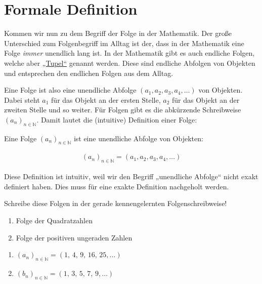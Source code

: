 \documentclass[fontsize=9pt,
               parskip=half-,
               DIV=14,
               listof=chapterentry,
               tocflat]{scrbook}
\begin{document}
\section{Formale Definition}

Kommen wir nun zu dem Begriff der Folge in der Mathematik. Der große Unterschied zum Folgenbegriff im Alltag ist der, dass in der Mathematik eine Folge \emph{immer} unendlich lang ist. In der Mathematik gibt es auch endliche Folgen, welche aber \href{https://de.wikibooks.org/wiki/Mathe\_für\_Nicht-Freaks:\_Tupel\_und\_geordnetes\_Paar}
{„Tupel“} genannt werden. Diese sind endliche Abfolgen von Objekten und entsprechen den endlichen Folgen aus dem Alltag.

Eine Folge ist also eine unendliche Abfolge $(a_{1},a_{2},a_{3},a_{4},\ldots )$ von Objekten. Dabei steht $a_{1}$ für das Objekt an der ersten Stelle, $a_{2}$ für das Objekt an der zweiten Stelle und so weiter. Für Folgen gibt es die abkürzende Schreibweise $(a_{n})_{n\in \mathbb {N} }$. Damit lautet die (intuitive) Definition einer Folge:

\begin{importantparagraph*}
Eine Folge $(a_{n})_{n\in \mathbb {N} }$ ist eine unendliche Abfolge von Objekten:

\begin{align*}
(a_{n})_{n\in \mathbb {N} }=(a_{1},a_{2},a_{3},a_{4},\ldots )
\end{align*}

\end{importantparagraph*}

Diese Definition ist intuitiv, weil wir den Begriff „unendliche Abfolge“ nicht exakt definiert haben. Dies muss für eine exakte Definition nachgeholt werden.

\begin{mdframed}[style=semanticbox,frametitleaboveskip=3pt,innerbottommargin=3pt,frametitle={Verständnisaufgabe}]
Schreibe diese Folgen in der gerade kennengelernten Folgenschreibweise!

\begin{enumerate}
\item Folge der Quadratzahlen
\item Folge der positiven ungeraden Zahlen
\end{enumerate}

\end{mdframed}

\begin{answer*}
\begin{enumerate}
\item $(a_{n})_{n\in \mathbb {N} }=(1,\,4,\,9,\,16,\,25,\ldots )$
\item $(b_{n})_{n\in \mathbb {N} }=(1,\,3,\,5,\,7,\,9,\ldots )$
\end{enumerate}

\end{answer*}
\end{document}
